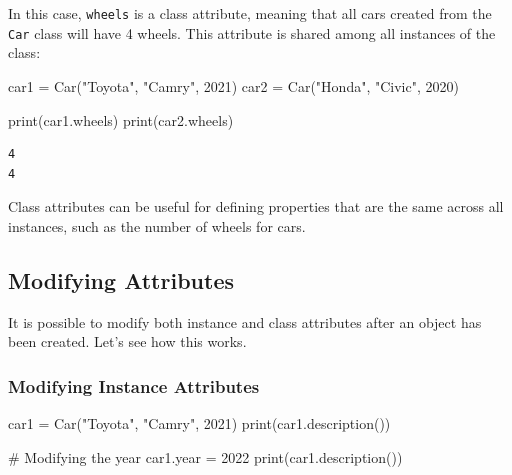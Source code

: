 \documentclass[
  letterpaper,
  DIV=11,
  numbers=noendperiod]{scrreprt}
\newenvironment{Shaded}{\begin{snugshade}}{\end{snugshade}}
\newcommand{\BuiltInTok}[1]{\textcolor[rgb]{0.00,0.23,0.31}{#1}}
\newcommand{\CommentTok}[1]{\textcolor[rgb]{0.37,0.37,0.37}{#1}}
\newcommand{\DecValTok}[1]{\textcolor[rgb]{0.68,0.00,0.00}{#1}}
\newcommand{\NormalTok}[1]{\textcolor[rgb]{0.00,0.23,0.31}{#1}}
\newcommand{\OperatorTok}[1]{\textcolor[rgb]{0.37,0.37,0.37}{#1}}
\newcommand{\StringTok}[1]{\textcolor[rgb]{0.13,0.47,0.30}{#1}}
\begin{document}
In this case, \texttt{wheels} is a class attribute, meaning that all
cars created from the \texttt{Car} class will have 4 wheels. This
attribute is shared among all instances of the class:

\begin{Shaded}
\begin{Highlighting}[]
\NormalTok{car1 }\OperatorTok{=}\NormalTok{ Car(}\StringTok{"Toyota"}\NormalTok{, }\StringTok{"Camry"}\NormalTok{, }\DecValTok{2021}\NormalTok{)}
\NormalTok{car2 }\OperatorTok{=}\NormalTok{ Car(}\StringTok{"Honda"}\NormalTok{, }\StringTok{"Civic"}\NormalTok{, }\DecValTok{2020}\NormalTok{)}

\BuiltInTok{print}\NormalTok{(car1.wheels)  }
\BuiltInTok{print}\NormalTok{(car2.wheels)  }
\end{Highlighting}
\end{Shaded}

\begin{verbatim}
4
4
\end{verbatim}

Class attributes can be useful for defining properties that are the same
across all instances, such as the number of wheels for cars.

\hypertarget{modifying-attributes}{%
\subsection{Modifying Attributes}\label{modifying-attributes}}

It is possible to modify both instance and class attributes after an
object has been created. Let's see how this works.

\hypertarget{modifying-instance-attributes}{%
\subsubsection{Modifying Instance
Attributes}\label{modifying-instance-attributes}}

\begin{Shaded}
\begin{Highlighting}[]
\NormalTok{car1 }\OperatorTok{=}\NormalTok{ Car(}\StringTok{"Toyota"}\NormalTok{, }\StringTok{"Camry"}\NormalTok{, }\DecValTok{2021}\NormalTok{)}
\BuiltInTok{print}\NormalTok{(car1.description())  }

\CommentTok{\# Modifying the year}
\NormalTok{car1.year }\OperatorTok{=} \DecValTok{2022}
\BuiltInTok{print}\NormalTok{(car1.description())  }
\end{Highlighting}
\end{Shaded}
\end{document}
